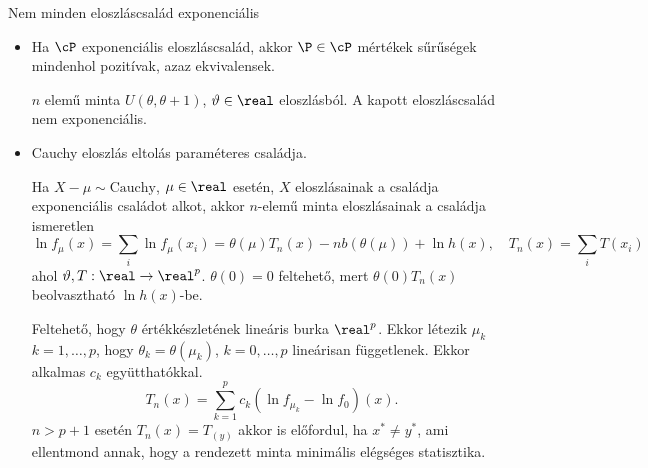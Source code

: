 \documentclass[aspectratio=169,notheorems,9pt,\option]{beamer}
\begin{document}
\begin{frame}{Nem minden eloszláscsalád exponenciális}
  \begin{itemize}
    \item Ha $\cP$ exponenciális eloszláscsalád, akkor $\P\in\cP$ mértékek sűrűségek mindenhol pozitívak, 
    azaz ekvivalensek.

    $n$ elemű minta $U(\theta,\theta+1)$, $\theta\in\real$ eloszlásból.
    A kapott eloszláscsalád nem exponenciális.
    \item Cauchy eloszlás eltolás paraméteres családja. 
    
    Ha $X-\mu\sim \text{Cauchy}$, $\mu\in\real$ esetén, $X$ eloszlásainak a családja exponenciális családot alkot, 
    akkor $n$-elemű minta eloszlásainak a családja ismeretlen
    \begin{displaymath}
      \ln f_\mu(x)=\sum_i \ln f_\mu(x_i)=\theta(\mu)T_n(x)-nb(\theta(\mu))+\ln h(x), \quad T_n(x)=\sum_i T(x_i) 
    \end{displaymath}
    ahol $\theta,T:\real\to\real^p$. $\theta(0)=0$ feltehető, mert $\theta(0)T_n(x)$ beolvasztható $\ln h(x)$-be. 

    Feltehető, hogy $\theta$ értékkészletének lineáris burka $\real^p$. Ekkor létezik $\mu_k$ $k=1,\dots,p$, 
    hogy $\theta_k=\theta(\mu_k)$, $k=0,\dots,p$ lineárisan függetlenek. Ekkor alkalmas $c_k$ együtthatókkal.
    \begin{displaymath}
      T_n(x)=\sum_{k=1}^p c_k (\ln f_{\mu_k}-\ln f_0)(x).
    \end{displaymath}
    $n>p+1$ esetén $T_n(x)=T_(y)$ akkor is előfordul, ha $x^*\neq y^*$, ami ellentmond annak, hogy a 
    rendezett minta minimális elégséges statisztika.

  \end{itemize}
  
\end{frame}
\end{document}

